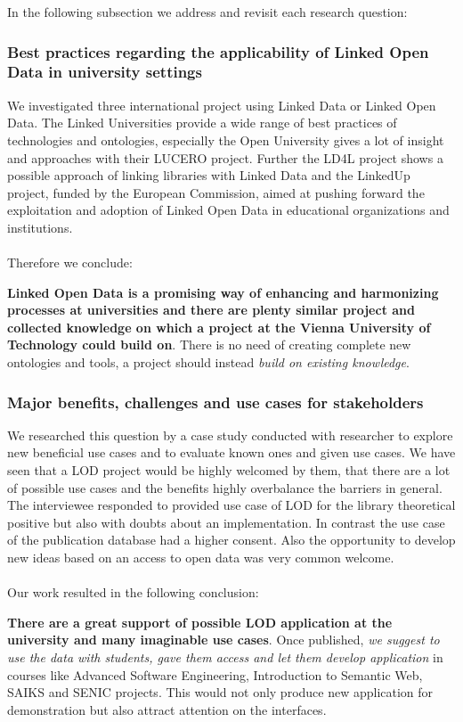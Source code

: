 In the following subsection we address and revisit each research question:

\subsubsection{Best practices regarding the applicability of Linked Open Data in university settings}
We investigated three international project using Linked Data or Linked Open Data. The Linked Universities provide a wide range of best practices of technologies and ontologies, especially the Open University gives a lot of insight and approaches with their LUCERO project. Further the LD4L project shows a possible approach of linking libraries with Linked Data and the LinkedUp project, funded by the European Commission, aimed at pushing forward the exploitation and adoption of Linked Open Data in educational organizations and institutions.
\\~\\
Therefore we conclude:

\textbf{Linked Open Data is a promising way of enhancing and harmonizing processes at universities and there are plenty similar project and collected knowledge on which a project at the Vienna University of Technology could build on}. There is no need of creating complete new ontologies and tools, a project should instead \textit{build on existing knowledge}.

\subsubsection{Major benefits, challenges and use cases for stakeholders}
We researched this question by a case study conducted with researcher to explore new beneficial use cases and to evaluate known ones and given use cases. We have seen that a LOD project would be highly welcomed by them, that there are a lot of possible use cases and the benefits highly overbalance the barriers in general. The interviewee responded to provided use case of LOD for the library theoretical positive but also with doubts about an implementation. In contrast the use case of the publication database had a higher consent. Also the opportunity to develop new ideas based on an access to open data was very common welcome.
\\~\\
Our work resulted in the following conclusion:

\textbf{There are a great support of possible LOD application at the university and many imaginable use cases}. Once published, \textit{we suggest to use the data with students, gave them access and let them develop application} in courses like Advanced Software Engineering, Introduction to Semantic Web, SAIKS and SENIC projects. This would not only produce new application for demonstration but also attract attention on the interfaces.

